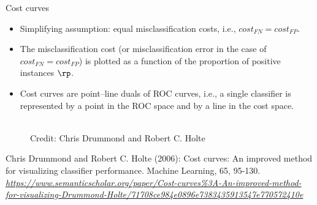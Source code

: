 \documentclass[11pt,compress,t,notes=noshow, xcolor=table]{beamer}
\begin{document}
\begin{vbframe}{Cost curves}
\begin{footnotesize}
\begin{itemize}
  \item Simplifying assumption: equal misclassification costs, i.e., $cost_{FN} = cost_{FP}$.
  \item The misclassification cost (or misclassification error in the case of $cost_{FN} = cost_{FP}$) is plotted as a function of the proportion of positive instances $\rp$.
  \item Cost curves are point–line duals of ROC curves, i.e., a single classifier is represented by a point in the ROC space and by a line in the cost space.
\end{itemize}
\end{footnotesize}
\vspace{-0.5  cm}
\begin{figure}
    \centering
    \tiny{\\ Credit: Chris Drummond and Robert C. Holte  \\}
\end{figure}
\vspace{-0.25cm}
{\tiny{Chris Drummond and Robert C. Holte (2006): Cost curves: An improved method for visualizing classifier performance. Machine Learning, 65, 95-130. \emph{\url{https://www.semanticscholar.org/paper/Cost-curves\%3A-An-improved-method-for-visualizing-Drummond-Holte/71708ce984e0896e7383435913547e770572410e}}}\par}

\end{vbframe}
\end{document}
